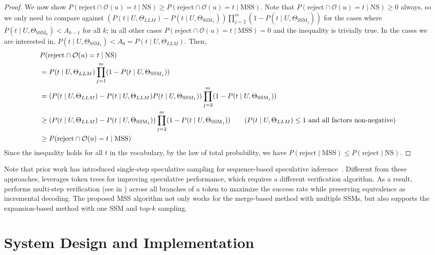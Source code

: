 \begin{proof}
We now show $P(\textrm{reject} \cap \mathcal{O}(u)=t \mid \textrm{NS}) \geq P(\textrm{reject} \cap \mathcal{O}(u)=t \mid \textrm{MSS})$. Note that $P(\textrm{reject} \cap \mathcal{O}(u)=t \mid \textrm{NS}) \geq 0$ always, so we only need to compare against $(P(t \mid U, \Theta_{LLM})-P(t \mid U, \Theta_{\textrm{SSM}_1}))\prod_{j=2}^m (1-P(t \mid U, \Theta_{\textrm{SSM}_j}))$ for the cases where $P(t \mid U, \Theta_{\textrm{SSM}_k}) < A_{k-1}$ for all $k$; in all other cases $P(\textrm{reject} \cap \mathcal{O}(u)=t \mid \textrm{MSS}) = 0$ and the inequality is trivially true. In the cases we are interested in, $P(t \mid U, \Theta_{\textrm{SSM}_1}) < A_0 = P(t \mid U, \Theta_{LLM})$. Then,
\begin{align*}
    &P(\textrm{reject} \cap \mathcal{O}(u)=t \mid \textrm{NS}) \\
    &= P(t \mid U, \Theta_{LLM})\prod_{j=1}^m (1-P(t \mid U, \Theta_{\textrm{SSM}_j})) \\
    &= (P(t \mid U, \Theta_{LLM}) - P(t \mid U, \Theta_{LLM})P(t \mid U, \Theta_{\textrm{SSM}_1}))
    \prod_{j=2}^m (1-P(t \mid U, \Theta_{\textrm{SSM}_j})) \\
    &\geq (P(t \mid U, \Theta_{LLM}) - P(t \mid U, \Theta_{\textrm{SSM}_1}))\prod_{j=2}^m (1-P(t \mid U, \Theta_{\textrm{SSM}_j})) \tag{$P(t \mid U, \Theta_{LLM}) \leq 1$ and all factors non-negative} \\
    &\geq P(\textrm{reject} \cap \mathcal{O}(u)=t \mid \textrm{MSS})
\end{align*}
Since the inequality holds for all $t$ in the vocabulary, by the law of total probability, we have $P(\textrm{reject}\mid \textrm{MSS}) \leq P(\textrm{reject}\mid\textrm{NS})$.
\end{proof}

Note that prior work has introduced single-step speculative sampling for sequence-based speculative inference~\cite{leviathan2022fast,chen2023accelerating}. Different from these approaches, \SpecInfer leverages token trees for improving speculative performance, which requires a different verification algorithm. As a result, \SpecInfer performs multi-step verification (see  in ) across all branches of a token to maximize the success rate while preserving equivalence as incremental decoding.
The proposed MSS algorithm not only works for the merge-based method with multiple SSMs, but also supports the expansion-based method with one SSM and top-$k$ sampling.

\section{System Design and Implementation}
\label{specinfer:sec:system}

